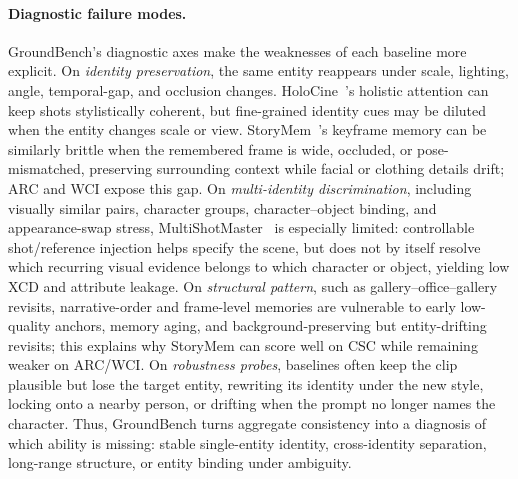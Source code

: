 \paragraph{Diagnostic failure modes.}
GroundBench's diagnostic axes make the weaknesses of each baseline more explicit. On \emph{identity preservation}, the same entity reappears under scale, lighting, angle, temporal-gap, and occlusion changes. HoloCine~\cite{holocine}'s holistic attention can keep shots stylistically coherent, but fine-grained identity cues may be diluted when the entity changes scale or view. StoryMem~\cite{storymem}'s keyframe memory can be similarly brittle when the remembered frame is wide, occluded, or pose-mismatched, preserving surrounding context while facial or clothing details drift; ARC and WCI expose this gap. On \emph{multi-identity discrimination}, including visually similar pairs, character groups, character--object binding, and appearance-swap stress, MultiShotMaster~\cite{multishotmaster} is especially limited: controllable shot/reference injection helps specify the scene, but does not by itself resolve which recurring visual evidence belongs to which character or object, yielding low XCD and attribute leakage. On \emph{structural pattern}, such as gallery--office--gallery revisits, narrative-order and frame-level memories are vulnerable to early low-quality anchors, memory aging, and background-preserving but entity-drifting revisits; this explains why StoryMem can score well on CSC while remaining weaker on ARC/WCI. On \emph{robustness probes}, baselines often keep the clip plausible but lose the target entity, rewriting its identity under the new style, locking onto a nearby person, or drifting when the prompt no longer names the character.
Thus, GroundBench turns aggregate consistency into a diagnosis of which ability is missing: stable single-entity identity, cross-identity separation, long-range structure, or entity binding under ambiguity.

